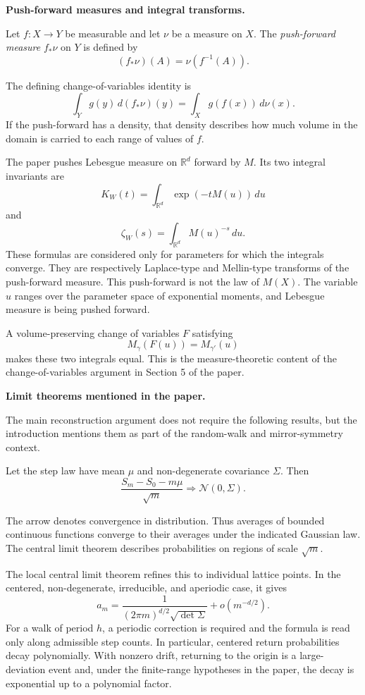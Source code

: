 \medskip\noindent
{\bf Push-forward measures and integral
transforms.}

\begin{definition}
\label{definition-push-forward-measure}
Let $f:X\to Y$ be measurable and let
$\nu$ be a measure on $X$. The
\emph{push-forward measure} $f_*\nu$ on
$Y$ is defined by
$$
(f_*\nu)(A)=\nu(f^{-1}(A)).
$$
\end{definition}

The defining change-of-variables identity
is
$$
\int_Y g(y)\,d(f_*\nu)(y)
=\int_X g(f(x))\,d\nu(x).
$$
If the push-forward has a density, that
density describes how much volume in the
domain is carried to each range of values
of $f$.

The paper pushes Lebesgue measure on
$\mathbb R^d$ forward by $M$. Its two
integral invariants are
$$
K_W(t)
=\int_{\mathbb R^d}
 \exp(-tM(u))\,du
$$
and
$$
\zeta_W(s)
=\int_{\mathbb R^d}M(u)^{-s}\,du.
$$
These formulas are considered only for
parameters for which the integrals
converge.
They are respectively Laplace-type and
Mellin-type transforms of the push-forward
measure. This push-forward is not the law
of $M(X)$. The variable $u$ ranges over
the parameter space of exponential
moments, and Lebesgue measure is being
pushed forward.

A volume-preserving change of variables
$F$ satisfying
$$
M_\gamma(F(u))=M_{\gamma'}(u)
$$
makes these two integrals equal. This is
the measure-theoretic content of the
change-of-variables argument in Section 5
of the paper.

\medskip\noindent
{\bf Limit theorems mentioned in the
paper.}

The main reconstruction argument does not
require the following results, but the
introduction mentions them as part of the
random-walk and mirror-symmetry context.

\begin{theorem}
\label{theorem-central-limit-lattice-walk}
Let the step law have mean $\mu$ and
non-degenerate covariance $\Sigma$. Then
$$
\frac{S_m-S_0-m\mu}{\sqrt m}
\Longrightarrow
\mathcal N(0,\Sigma).
$$
\end{theorem}

The arrow denotes convergence in
distribution. Thus averages of bounded
continuous functions converge to their
averages under the indicated Gaussian
law. The central limit theorem describes
probabilities on regions of scale
$\sqrt m$.

The local central limit theorem refines
this to individual lattice points. In the
centered, non-degenerate, irreducible, and
aperiodic case, it gives
$$
a_m
=\frac{1}{
 (2\pi m)^{d/2}\sqrt{\det\Sigma}}
+o(m^{-d/2}).
$$
For a walk of period $h$, a periodic
correction is required and the formula is
read only along admissible step counts.
In particular, centered return
probabilities decay polynomially. With
nonzero drift, returning to the origin is
a large-deviation event and, under the
finite-range hypotheses in the paper, the
decay is exponential up to a polynomial
factor.

